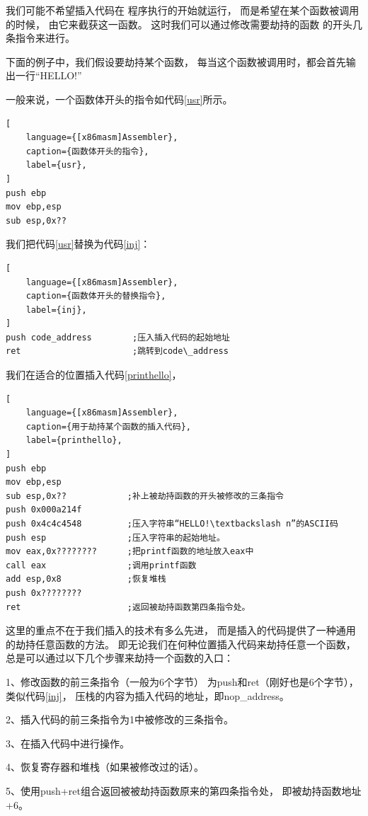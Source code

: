我们可能不希望插入代码在
程序执行的开始就运行，
而是希望在某个函数被调用的时候，
由它来截获这一函数。
这时我们可以通过修改需要劫持的函数
的开头几条指令来进行。

下面的例子中，我们假设要劫持某个函数，
每当这个函数被调用时，都会首先输出一行“HELLO!”


一般来说，一个函数体开头的指令如代码\ref{usr}所示。

\begin{lstlisting}[
    language={[x86masm]Assembler},
    caption={函数体开头的指令},
    label={usr},
]
push ebp          
mov ebp,esp       
sub esp,0x??               
\end{lstlisting}

我们把代码\ref{usr}替换为代码\ref{inj}：

\begin{lstlisting}[
    language={[x86masm]Assembler},
    caption={函数体开头的替换指令},
    label={inj},
]
push code_address        ;压入插入代码的起始地址
ret                      ;跳转到code\_address
\end{lstlisting}


我们在适合的位置插入代码\ref{printhello}，
\begin{lstlisting}[
    language={[x86masm]Assembler},
    caption={用于劫持某个函数的插入代码},
    label={printhello},
]
push ebp
mov ebp,esp
sub esp,0x??            ;补上被劫持函数的开头被修改的三条指令
push 0x000a214f
push 0x4c4c4548         ;压入字符串“HELLO!\textbackslash n”的ASCII码
push esp                ;压入字符串的起始地址。  
mov eax,0x????????      ;把printf函数的地址放入eax中
call eax                ;调用printf函数
add esp,0x8             ;恢复堆栈
push 0x????????        
ret                     ;返回被劫持函数第四条指令处。
\end{lstlisting}

这里的重点不在于我们插入的技术有多么先进，
而是插入的代码提供了一种通用的劫持任意函数的方法。
即无论我们在何种位置插入代码来劫持任意一个函数，
总是可以通过以下几个步骤来劫持一个函数的入口：

1、修改函数的前三条指令（一般为6个字节）
为push和ret（刚好也是6个字节），类似代码\ref{inj}，
压栈的内容为插入代码的地址，即nop\_address。

2、插入代码的前三条指令为1中被修改的三条指令。

3、在插入代码中进行操作。

4、恢复寄存器和堆栈（如果被修改过的话）。

5、使用push+ret组合返回被被劫持函数原来的第四条指令处，
即被劫持函数地址+6。


